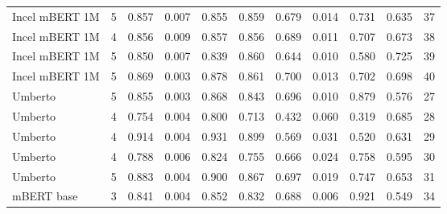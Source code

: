 \begin{tabular}{lrrrrrrrrrr}
    Incel mBERT 1M &      5 &  0.857 &                 0.007 &          0.855 &                  0.859 &                   0.679 &                 0.014 &           0.731 &                  0.635 &                      37 \\
    Incel mBERT 1M &      4 &  0.856 &                 0.009 &          0.857 &                  0.856 &                   0.689 &                 0.011 &           0.707 &                  0.673 &                      38 \\
    Incel mBERT 1M &      5 &  0.850 &                 0.007 &          0.839 &                  0.860 &                   0.644 &                 0.010 &           0.580 &                  0.725 &                      39 \\
    Incel mBERT 1M &      5 &  0.869 &                 0.003 &          0.878 &                  0.861 &                   0.700 &                 0.013 &           0.702 &                  0.698 &                      40 \\
           Umberto &      5 &  0.855 &                 0.003 &          0.868 &                  0.843 &                   0.696 &                 0.010 &           0.879 &                  0.576 &                      27 \\
           Umberto &      4 &  0.754 &                 0.004 &          0.800 &                  0.713 &                   0.432 &                 0.060 &           0.319 &                  0.685 &                      28 \\
           Umberto &      4 &  0.914 &                 0.004 &          0.931 &                  0.899 &                   0.569 &                 0.031 &           0.520 &                  0.631 &                      29 \\
           Umberto &      4 &  0.788 &                 0.006 &          0.824 &                  0.755 &                   0.666 &                 0.024 &           0.758 &                  0.595 &                      30 \\
           Umberto &      5 &  0.883 &                 0.004 &          0.900 &                  0.867 &                   0.697 &                 0.019 &           0.747 &                  0.653 &                      31 \\
        mBERT base &      3 &  0.841 &                 0.004 &          0.852 &                  0.832 &                   0.688 &                 0.006 &           0.921 &                  0.549 &                      34 \\

\end{tabular}
